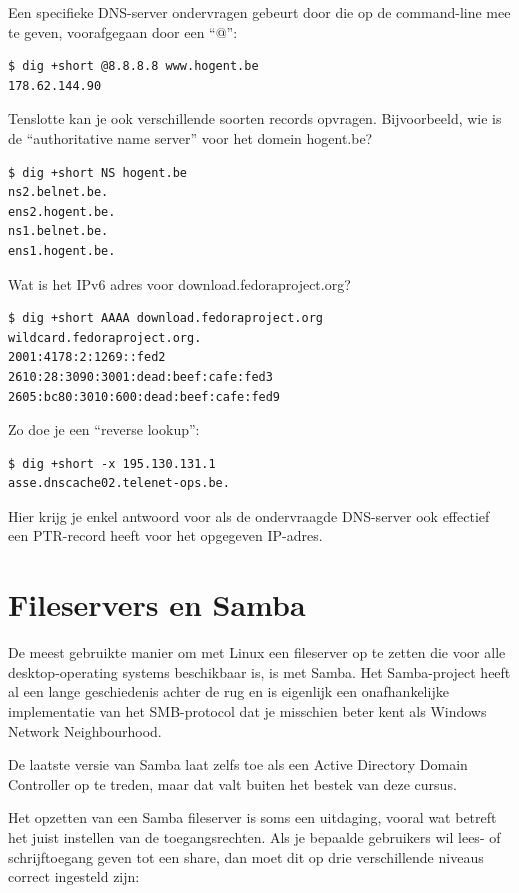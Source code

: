 Een specifieke DNS-server ondervragen gebeurt door die op de command-line mee te geven, voorafgegaan door een ``@'':

\begin{verbatim}
$ dig +short @8.8.8.8 www.hogent.be
178.62.144.90
\end{verbatim}

Tenslotte kan je ook verschillende soorten records opvragen. Bijvoorbeeld, wie is de ``authoritative name server'' voor het domein hogent.be?

\begin{verbatim}
$ dig +short NS hogent.be
ns2.belnet.be.
ens2.hogent.be.
ns1.belnet.be.
ens1.hogent.be.
\end{verbatim}

Wat is het IPv6 adres voor download.fedoraproject.org?

\begin{verbatim}
$ dig +short AAAA download.fedoraproject.org
wildcard.fedoraproject.org.
2001:4178:2:1269::fed2
2610:28:3090:3001:dead:beef:cafe:fed3
2605:bc80:3010:600:dead:beef:cafe:fed9
\end{verbatim}

Zo doe je een ``reverse lookup'':

\begin{verbatim}
$ dig +short -x 195.130.131.1
asse.dnscache02.telenet-ops.be.
\end{verbatim}

Hier krijg je enkel antwoord voor als de ondervraagde DNS-server ook effectief een PTR-record heeft voor het opgegeven IP-adres.

\section{Fileservers en Samba}
\label{sec:fileservers-en-samba}

De meest gebruikte manier om met Linux een fileserver op te zetten die voor alle desktop-operating systems beschikbaar is, is met Samba. Het Samba-project heeft al een lange geschiedenis achter de rug en is eigenlijk een onafhankelijke implementatie van het SMB-protocol dat je misschien beter kent als Windows Network Neighbourhood.

De laatste versie van Samba laat zelfs toe als een Active Directory Domain Controller op te treden, maar dat valt buiten het bestek van deze cursus.

Het opzetten van een Samba fileserver \autocite{VanVreckem2014,VernooijEtAl2010} is soms een uitdaging, vooral wat betreft het juist instellen van de toegangsrechten. Als je bepaalde gebruikers wil lees- of schrijftoegang geven tot een share, dan moet dit op drie verschillende niveaus correct ingesteld zijn:

